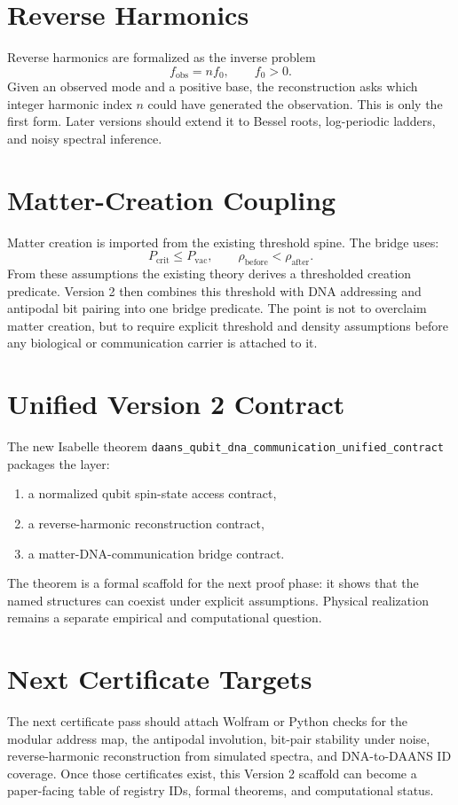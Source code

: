 \documentclass[11pt]{article}
\theoremstyle{remark}
\begin{document}
\section{Reverse Harmonics}

Reverse harmonics are formalized as the inverse problem
\[
f_{\mathrm{obs}}=n f_0,\qquad f_0>0.
\]
Given an observed mode and a positive base, the reconstruction asks which integer harmonic index \(n\) could have generated the observation.  This is only the first form.  Later versions should extend it to Bessel roots, log-periodic ladders, and noisy spectral inference.

\section{Matter-Creation Coupling}

Matter creation is imported from the existing threshold spine.  The bridge uses:
\[
P_{\mathrm{crit}}\leq P_{\mathrm{vac}},
\qquad
\rho_{\mathrm{before}}<\rho_{\mathrm{after}}.
\]
From these assumptions the existing theory derives a thresholded creation predicate.  Version 2 then combines this threshold with DNA addressing and antipodal bit pairing into one bridge predicate.  The point is not to overclaim matter creation, but to require explicit threshold and density assumptions before any biological or communication carrier is attached to it.

\section{Unified Version 2 Contract}

The new Isabelle theorem \texttt{daans\_qubit\_dna\_communication\_unified\_contract} packages the layer:
\begin{enumerate}
  \item a normalized qubit spin-state access contract,
  \item a reverse-harmonic reconstruction contract,
  \item a matter-DNA-communication bridge contract.
\end{enumerate}
The theorem is a formal scaffold for the next proof phase: it shows that the named structures can coexist under explicit assumptions.  Physical realization remains a separate empirical and computational question.

\section{Next Certificate Targets}

The next certificate pass should attach Wolfram or Python checks for the modular address map, the antipodal involution, bit-pair stability under noise, reverse-harmonic reconstruction from simulated spectra, and DNA-to-DAANS ID coverage.  Once those certificates exist, this Version 2 scaffold can become a paper-facing table of registry IDs, formal theorems, and computational status.
\end{document}
